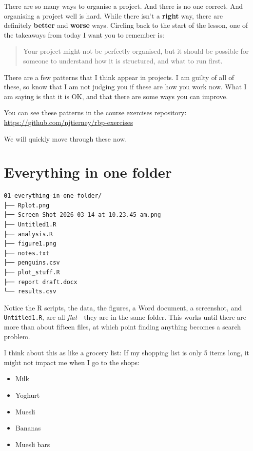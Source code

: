 \documentclass[
  letterpaper,
  justified,
  a4paper]{tufte-book}
\providecommand{\tightlist}{%
  \setlength{\itemsep}{0pt}\setlength{\parskip}{0pt}}
\providecommand{\tightlist}{%
  \setlength{\itemsep}{0pt}\setlength{\parskip}{0pt}}
\begin{document}
There are so many ways to organise a project. And there is no one
correct. And organising a project well is hard. While there isn't a
\textbf{right} way, there are definitely \textbf{better} and
\textbf{worse} ways. Circling back to the start of the lesson, one of
the takeaways from today I want you to remember is:

\begin{quote}
Your project might not be perfectly organised, but it should be possible
for someone to understand how it is structured, and what to run first.
\end{quote}

There are a few patterns that I think appear in projects. I am guilty of
all of these, so know that I am not judging you if these are how you
work now. What I am saying is that it is OK, and that there are some
ways you can improve.

You can see these patterns in the course exercises repository:
\url{https://github.com/njtierney/rbp-exercises}

We will quickly move through these now.

\section{Everything in one folder}\label{everything-in-one-folder}

\begin{verbatim}
01-everything-in-one-folder/
├── Rplot.png
├── Screen Shot 2026-03-14 at 10.23.45 am.png
├── Untitled1.R
├── analysis.R
├── figure1.png
├── notes.txt
├── penguins.csv
├── plot_stuff.R
├── report draft.docx
└── results.csv
\end{verbatim}

Notice the R scripts, the data, the figures, a Word document, a
screenshot, and \texttt{Untitled1.R}, are all \emph{flat} - they are in
the same folder. This works until there are more than about fifteen
files, at which point finding anything becomes a search problem.

I think about this as like a grocery list: If my shopping list is only 5
items long, it might not impact me when I go to the shops:

\begin{itemize}
\tightlist
\item
  Milk
\item
  Yoghurt
\item
  Muesli
\item
  Bananas
\item
  Muesli bars
\end{itemize}
\end{document}
